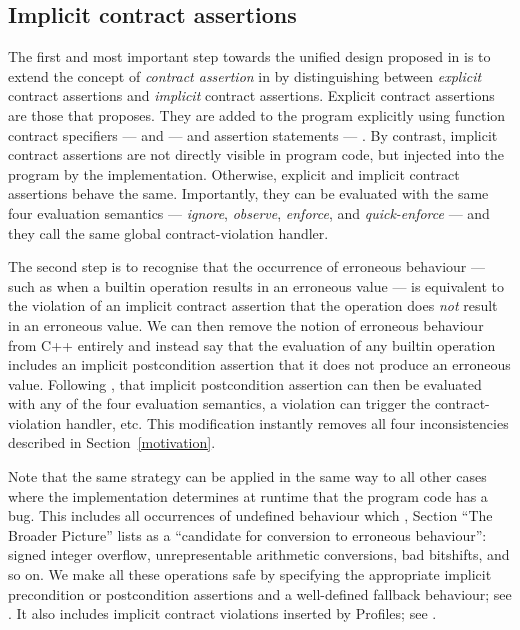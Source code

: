 \subsection{Implicit contract assertions}

The first  and most important step towards the unified design proposed in \cite{P3100R1} is to extend the concept of \emph{contract assertion} in \cite{P2900R13} by distinguishing between \emph{explicit} contract assertions and \emph{implicit} contract assertions. Explicit contract assertions are those that \cite{P2900R13} proposes. They are added to the program explicitly using function contract specifiers ---  and  --- and assertion statements --- \mbox{}. By contrast, implicit contract assertions are not directly visible in program code, but injected into the program by the implementation. Otherwise, explicit and implicit contract assertions behave the same. Importantly, they can be evaluated with the same four evaluation semantics --- \emph{ignore}, \emph{observe}, \emph{enforce}, and \emph{quick-enforce} --- and they call the same global contract-violation handler.

The second step is to recognise that the occurrence of erroneous behaviour --- such as when a builtin operation results in an erroneous value --- is equivalent to the violation of an implicit contract assertion that the operation does \emph{not} result in an erroneous value. We can then remove the notion of erroneous behaviour from C++ entirely and instead say that the evaluation of any builtin operation includes an implicit postcondition assertion that it does not produce an erroneous value. Following \cite{P2900R13}, that implicit postcondition assertion can then be evaluated with any of the four evaluation semantics, a violation can trigger the contract-violation handler, etc. This modification instantly removes all four inconsistencies described in Section~\ref{motivation}.

Note that the same strategy can be applied in the same way to all other cases where the implementation determines at runtime that the program code has a bug. This includes all occurrences of undefined behaviour which \cite{P2795R5}, Section ``The Broader Picture'' lists as a ``candidate for conversion to erroneous behaviour'': signed integer overflow, unrepresentable arithmetic conversions, bad bitshifts, and so on. We make all these operations safe by specifying the appropriate implicit precondition or postcondition assertions and a well-defined fallback behaviour; see \cite{P3100R1}. It also includes implicit contract violations inserted by Profiles; see \cite{P3081R1}.


